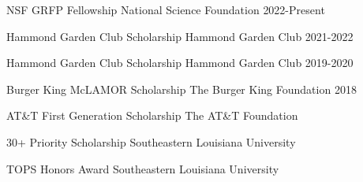 
\begin{cvhonors}

  \cvhonor
    {NSF GRFP Fellowship} %
    {National Science Foundation} %
    {} %
    {2022-Present} %

  \cvhonor
    {Hammond Garden Club Scholarship} %
    {Hammond Garden Club} %
    {} %
    {2021-2022} %

  \cvhonor
    {Hammond Garden Club Scholarship} %
    {Hammond Garden Club} %
    {} %
    {2019-2020} %

\end{cvhonors}

\begin{cvhonors}

  \cvhonor
    {Burger King McLAMOR Scholarship} %
    {The Burger King Foundation} %
    {} %
    {2018} %

  \cvhonor
    {AT\&T First Generation Scholarship} %
    {The AT\&T Foundation} %
    {} %
    {} %

  \cvhonor
    {30+ Priority Scholarship} %
    {Southeastern Louisiana University} %
    {} %
    {} %

  \cvhonor
    {TOPS Honors Award} %
    {Southeastern Louisiana University} %
    {} %
    {} %

\end{cvhonors}

\begin{cvhonors}


\end{cvhonors}